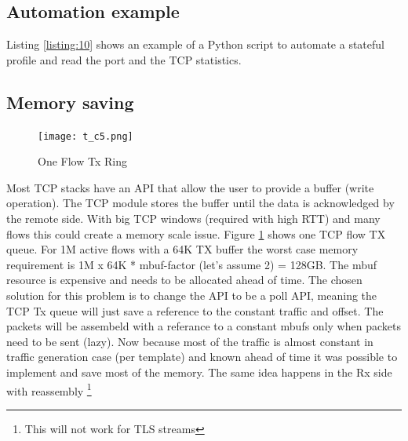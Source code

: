 \documentclass[conference]{IEEEtran}
\begin{document}
\subsection{Automation example}

Listing \ref{listing:10} shows an example of a Python script to automate a stateful profile and read the port and the TCP statistics.


\subsection{Memory saving}

\begin{figure}[h]
  \texttt{[image: t\_c5.png]}
  \caption{One Flow Tx Ring}
  \label{fig:tx_ring}
\end{figure}

Most TCP stacks have an API that allow the user to provide a buffer (write operation). 
The TCP module stores the buffer until the data is acknowledged by the remote side. 
With big TCP windows (required with high RTT) and many flows this could create a memory scale issue. 
Figure \ref{fig:tx_ring} shows one TCP flow TX queue. For 1M active flows with a 64K TX buffer 
the worst case memory requirement is 1M x 64K * mbuf-factor (let's assume 2) = 128GB. 
The mbuf resource is expensive and needs to be allocated ahead of time. 
The chosen solution for this problem is to change the API to be a poll API, 
meaning the TCP Tx queue will just save a reference to the constant traffic and offset. The packets will be assembeld with a referance to a constant mbufs only when packets need to be sent (lazy). 
Now because most of the traffic is almost constant in traffic generation case (per template) and known ahead of time it was possible to implement and save most of the memory.
The same idea happens in the Rx side with reassembly \footnote{This will not work for TLS streams}
\end{document}
